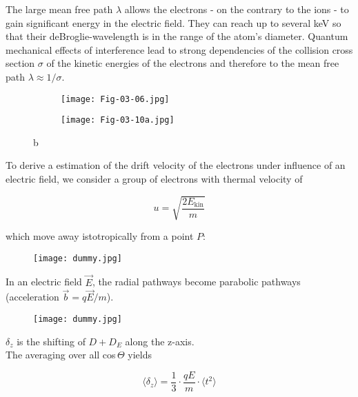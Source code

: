The large mean free path $\lambda$ allows the electrons - on the contrary to the ions - to gain
significant energy in the electric field. They can reach up to several keV so that their
deBroglie-wavelength is in the range of the atom's diameter. Quantum mechanical effects
of interference lead to strong dependencies of the collision cross section $\sigma$ of the kinetic
energies of the electrons and therefore to the mean free path $\lambda\approx
1/\sigma$.

\begin{figure}[htbp]
	\begin{minipage}[b]{0.65\textwidth}
		\begin{figure}[H]
		\centering
		\texttt{[image: Fig-03-06.jpg]}
		\end{figure}
	\end{minipage}
	\hspace{0.5cm}
	\begin{minipage}[b]{0.25\textwidth}
		\begin{figure}[H]
		\centering
		\texttt{[image: Fig-03-10a.jpg]}
		\end{figure}
	\end{minipage}
	\caption{b}
	\label{rekristall} 
\end{figure}

To derive a estimation of the drift velocity of the electrons under influence of an electric field,
we consider a group of electrons with thermal velocity of 

\[u=\sqrt{\frac{2E_{\text{kin}}}{m}}  \]

which move away istotropically from a point $P$:

\begin{figure}[H]
	\centering
	\texttt{[image: dummy.jpg]}
\end{figure}

In an electric field $\vec{E}$, the radial pathways become parabolic pathways (acceleration
$\vec{b}=q\vec{E}/m$).

\begin{figure}[H]
	\centering
	\texttt{[image: dummy.jpg]}
\end{figure}

$\delta_z$ is the shifting of $D+D_E$ along the z-axis.
\\
The averaging over all cos$\,\Theta$ yields

\[ \langle \delta_z \rangle = \frac{1}{3}\cdot \frac{qE}{m}\cdot \langle t^2 \rangle \]

